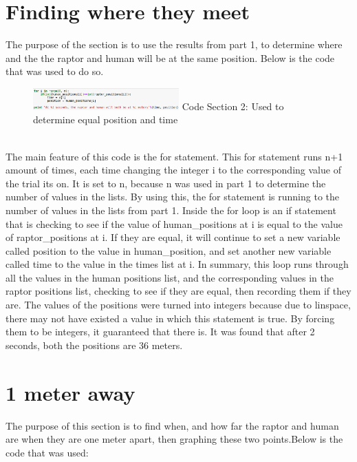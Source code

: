 \documentclass[twocolumn]{revtex4}
\begin{document}
\\
\\
\\
\\
\\

\section{Finding where they meet}
	The purpose of the section is to use the results from part 1, to determine where and the the 	raptor and human will be at the same position. Below is the code that was used to
	do so.\\
\begin{figure}[h!]
\includegraphics[width=0.5\textwidth]{Code2.png}
Code Section 2: Used to determine equal position and time

\end{figure}
\\The main feature of this code is the for statement. This for statement runs n+1 amount of times, each time changing the integer i to the corresponding value of the trial its on. It is set to n, because n was used in part 1 to determine the number of values in the lists. By using this, the for statement is running to the number of values in the lists from part 1. Inside the for loop is an if statement that is checking to see if the value of human\_positions at i is equal to the value of raptor\_positions at i. If they are equal, it will continue to set a new variable called position to the value in human\_position, and set another new variable called time to the value in the times list at i. In summary, this loop runs through all the values in the human positions list, and the corresponding values in the raptor positions list, checking to see if they are equal, then recording them if they are. The values of the positions were turned into integers because due to linspace, there may not have existed a value in which this statement is true. By forcing them to be integers, it guaranteed that there is. It was found that after 2 seconds, both the positions are 36 meters.

\section{1 meter away}
	The purpose of this section is to find when, and how far the raptor and human are 
	when they are one meter apart, then graphing these two points.Below is the code that was 	 used:
	\\
	\\
\end{document}
